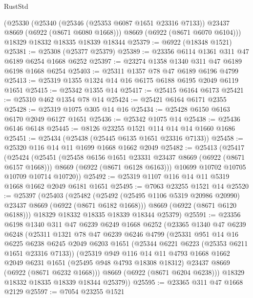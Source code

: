 \begin{lexlean}{RustStd}
\begin{coremodule}
    (@25330
      (@25340 (@25346 (@25353 @6087 @1651 @23316 @7133)) @23437 @8669 (@6922 (@8671 @6080 @1668)))
      @8669
      (@6922 (@8671 @6070 @6104)))
    @18329
    @18332
    @18335
    @18339
    @18344
@25379 := @6922 (@18348 @1521)
@25381 := @25308 (@25377 @25379)
@25389 := @23356 @6114 @1361 @311 @47 @6189 @6254 @1668 @6252
@25397 := @23274 @1358 @1340 @311 @47 @6189 @6198 @1668 @6254
@25403 := @25311 @1357 @78 @47 @6189 @6196 @4799
@25413 := @25319 @1355 @1324 @14 @16 @6175 @6188 @6195 @2049 @6119 @1651
@25415 := @25342 @1355 @14
@25417 := @25415 @6164 @6173
@25421 := @25310 @462 @1354 @78 @14
@25424 := @25421 @6164 @6171 @2355
@25428 := @25319 @1075 @305 @14 @16
@25434 := @25428 @6150 @6163 @6170 @2049 @6127 @1651
@25436 := @25342 @1075 @14
@25438 := @25436 @6146 @6148
@25445 := @8126 @23255 @1521 @114 @14 @14 @1660 @1686
@25451 := @25434 (@25438 (@25445 @6135 @1651 @23316 @7133))
@25458 := @25320 @116 @14 @11 @1699 @1668 @1662 @2049
@25482 := @25413
    (@25417
      (@25424
        (@25451
          (@25458 @6156 @1651 @23331 @23437 @8669 (@6922 (@8671 @6157 @1668)))
          @8669
          (@6922 (@8671 @6128 @6163)))
        @10699
        @10702
        @10705
        @10709
        @10714
        @10720))
@25492 := @25319 @1107 @116 @14 @11 @5319 @1668 @1662 @2049 @6181 @1651
@25495 := @7063 @23255 @1521 @14
@25520 := @25397
    (@25403
      (@25482
        (@25492 (@25495 @1106 @5319 @20986 @20990) @23437 @8669 (@6922 (@8671 @6182 @1668)))
        @8669
        (@6922 (@8671 @6120 @6188)))
      @18329
      @18332
      @18335
      @18339
      @18344
      @25379)
@25591 := @23356
    @6198
    @1340
    @311
    @47
    @6239
    @6249
    @1668
    @6252
    (@23365
      @1340
      @47
      @6239
      @6248
      (@25311
        @1321
        @78
        @47
        @6239
        @6246
        @4799
        (@25331
          @951
          @14
          @16
          @6225
          @6238
          @6245
          @2049
          @6203
          @1651
          (@25344 @6221 @6223 (@25353 @6211 @1651 @23316 @7133))
          (@25319
            @949
            @116
            @14
            @11
            @4793
            @1668
            @1662
            @2049
            @6231
            @1651
            (@25495 @948 @4793 @18308 @18312)
            @23437
            @8669
            (@6922 (@8671 @6232 @1668)))
          @8669
          (@6922 (@8671 @6204 @6238)))
        @18329
        @18332
        @18335
        @18339
        @18344
        @25379))
@25595 := @23365 @311 @47 @1668 @2129
@25597 := @7054 @23255 @1521

\end{coremodule}
\end{lexlean}
